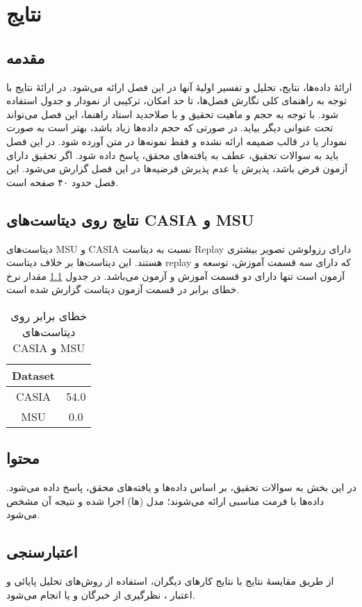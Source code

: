 \chapter{نتایج}
\label{chap:results}
\section{مقدمه} 
ارائهٔ داده‌ها، نتایج، تحلیل و تفسیر اولیهٔ آنها در این فصل ارائه می‌شود. در ارائهٔ نتایج با توجه به راهنمای کلی نگارش فصل‌ها، تا حد امکان، ترکیبی از نمودار و جدول استفاده شود. با توجه به حجم و ماهیت تحقیق و با صلاحدید استاد راهنما، این فصل می‌تواند تحت عنوانی دیگر بیاید. در صورتی که حجم داده‌ها زیاد باشد، بهتر است به صورت نمودار یا در قالب ضمیمه ارائه نشده و فقط نمونه‌ها در متن آورده شود. در این فصل باید به سوالات تحقیق، عطف به یافته‌های محقق، پاسخ داده شود. اگر تحقیق دارای آزمون فرض باشد، پذیرش یا عدم پذیرش فرضیه‌ها در این فصل گزارش می‌شود. این فصل حدود ۴۰ صفحه است.

\section{نتایج روی دیتاست‌های CASIA و MSU}
دیتاست‌های MSU و CASIA نسبت به دیتاست Replay دارای رزولوشن تصویر بیشتری هستند. این دیتاست‌ها بر خلاف دیتاست replay که دارای سه قسمت آموزش، توسعه و آزمون است تنها دارای دو قسمت آموزش و آزمون می‌باشد. در جدول
\ref{tab:eercasiamsu}
 مقدار نرخ خطای برابر در قسمت آزمون دیتاست گزارش شده است.
\begin{table}[ht]
	\caption{خطای برابر روی دیتاست‌های CASI‌A و ‌MSU}
	\label{tab:eercasiamsu}
	\centering
	\onehalfspacing
	\begin{tabular}{|c|c|}
		\hline Dataset &\lr{ EER (\%)}   \\
		\hline CASIA   & 54.0     \\
		\hline MSU     & 0.0 \\
		   \hline
	\end{tabular} 
\end{table}

\section{محتوا}
در این بخش به سوالات تحقیق، بر اساس داده‌ها و یافته‌های محقق، پاسخ داده می‌شود. داده‌ها با فرمت مناسبی ارائه می‌شوند؛ مدل (ها) اجرا شده و نتیجه آن مشخص می‌شود.

\section{اعتبارسنجی}
از طریق مقایسهٔ نتایج با نتایج کارهای دیگران، استفاده از روش‌های تحلیل پایائی
و اعتبار
،
نظرگیری از خبرگان
و یا
انجام می‌شود.
